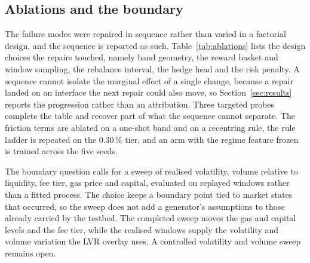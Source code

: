 \subsection{Ablations and the boundary}

The failure modes were repaired in sequence rather than varied in a factorial
design, and the sequence is reported as such. Table~\ref{tab:ablations} lists
the design choices the repairs touched, namely band geometry, the reward basket
and window sampling, the rebalance interval, the hedge head and the risk
penalty. A sequence cannot isolate the marginal effect of a single change,
because a repair landed on an interface the next repair could also move, so
Section~\ref{sec:results} reports the progression rather than an attribution.
Three targeted probes complete the table and recover part of what the sequence
cannot separate. The friction terms are ablated on a one-shot band and on a
recentring rule, the rule ladder is repeated on the $0.30\,\%$ tier, and an arm
with the regime feature frozen is trained across the five seeds.

The boundary question calls for a sweep of realised volatility, volume
relative to liquidity, fee tier, gas price and capital, evaluated on replayed
windows rather than a fitted process. The choice keeps a boundary point tied to
market states that occurred, so the sweep does not add a generator's
assumptions to those already carried by the testbed. The completed sweep moves
the gas and capital levels and the fee tier, while the realised windows supply
the volatility and volume variation the LVR overlay uses. A controlled
volatility and volume sweep remains open.

